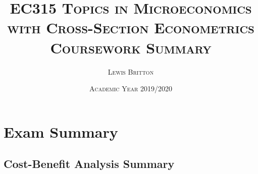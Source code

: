\documentclass[11pt, english]{article}
\begin{document}
                               
                                              
                       
        \title{\textsc{EC315 Topics in Microeconomics with Cross-Section Econometrics\\ Coursework Summary}}
        \author{\textsc{Lewis Britton}}
        \date{\textsc{Academic Year 2019/2020}}
        \maketitle
                                                                                                                                 
\newpage
                         
                                                                           
        \renewcommand{\contentsname}{Table of Contents}
                                       
        \tableofcontents

\newpage 


\section{Exam Summary}

	\subsection{Cost-Benefit Analysis Summary}
\end{document}
